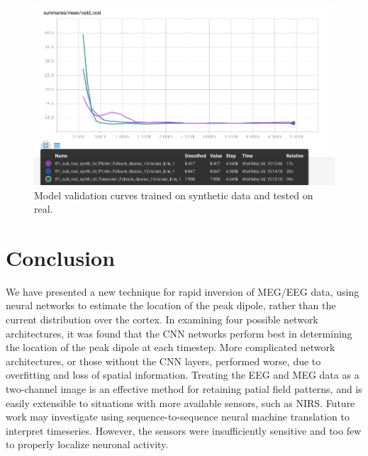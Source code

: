 \documentclass[journal,12pt,onecolumn,draftclsnofoot]{IEEEtran}
\begin{document}
\begin{figure}[h!]
\centering
\includegraphics[width=5in]{finalplots/train_synth_test_real_valid}
\caption{Model validation curves trained on synthetic data and tested on real.}
\label{fig:synthreal}
\end{figure}

\section{Conclusion}
We have presented a new technique for rapid inversion of MEG/EEG data, using neural networks to estimate the location of the peak dipole, rather than the current distribution over the cortex. In examining four possible network architectures, it was found that the CNN networks perform best in determining the location of the peak dipole at each timestep. More complicated network architectures, or those without the CNN layers, performed worse, due to overfitting and loss of spatial information. Treating the EEG and MEG data as a two-channel image is an effective method for retaining patial field patterns, and is easily extensible to situations with more available sensors, such as NIRS. Future work may investigate using sequence-to-sequence neural machine translation to interpret timeseries. However, the sensors were insufficiently sensitive and too few to properly localize neuronal activity.

\end{document}
